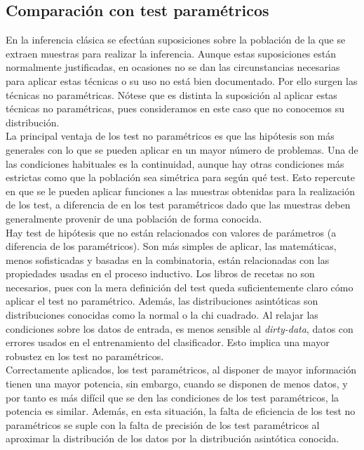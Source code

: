 	\subsection*{Comparación con test paramétricos}
	
	En la inferencia clásica se efectúan suposiciones sobre la población de la que se extraen muestras para realizar la inferencia. Aunque estas suposiciones están normalmente justificadas, en ocasiones no se dan las circunstancias necesarias para aplicar estas técnicas o su uso no está bien documentado. Por ello surgen las técnicas no paramétricas. Nótese que es distinta la suposición al aplicar estas técnicas no paramétricas, pues consideramos en este caso que no conocemos su distribución.\\
	
 	La principal ventaja de los test no paramétricos es que las hipótesis son más generales con lo que se pueden aplicar en un mayor número de problemas. Una de las condiciones habituales es la continuidad, aunque hay otras condiciones más estrictas como que la población sea simétrica para según qué test. Esto repercute en que se le pueden aplicar funciones a las muestras obtenidas para la realización de los test, a diferencia de en los test paramétricos dado que las muestras deben generalmente provenir de una población de forma conocida.\\
 	
 	Hay test de hipótesis que no están relacionados con valores de parámetros (a diferencia de los paramétricos). Son más simples de aplicar, las matemáticas, menos sofisticadas y basadas en la combinatoria, están relacionadas con las propiedades usadas en el proceso inductivo. Los libros de recetas no son necesarios, pues con la mera definición del test queda suficientemente claro cómo aplicar el test no paramétrico. Además, las distribuciones asintóticas son distribuciones conocidas como la normal o la chi cuadrado. Al relajar las condiciones sobre los datos de entrada, es menos sensible al \textit{dirty-data}, datos con errores usados en el entrenamiento del clasificador. Esto implica una mayor robustez en los test no paramétricos.\\
 	
 	Correctamente aplicados, los test paramétricos, al disponer de mayor información tienen una mayor potencia, sin embargo, cuando se disponen de menos datos, y por tanto es más difícil que se den las condiciones de los test paramétricos, la potencia es similar. Además, en esta situación, la falta de eficiencia de los test no paramétricos se suple con la falta de precisión de los test paramétricos al aproximar la distribución de los datos por la distribución asintótica conocida.


